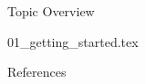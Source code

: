 



\begin{frame}{Topic Overview}
\tableofcontents
\end{frame}

{01_getting_started.tex}

\appendix
\beginbackup

\begin{frame}[allowframebreaks]{References}
\printbibliography
\end{frame}

\backupend


